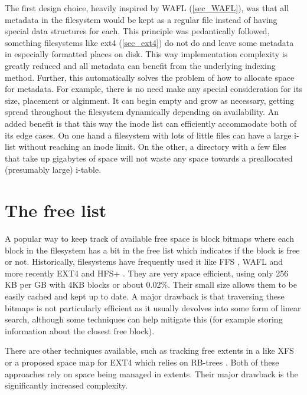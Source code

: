         The first design choice, heavily inspired by WAFL (\ref{sec_WAFL}), was
        that all metadata in the filesystem would be kept as a regular file
        instead of having special data structures for each. This principle was
        pedantically followed, something filesystems like ext4 (\ref{sec_ext4})
        do not do and leave some metadata in especially formatted places on
        disk. This way implementation complexity is greatly reduced and all
        metadata can benefit from the underlying indexing method. Further, this
        automatically solves the problem of how to allocate space for metadata.
        For example, there is no need make any special consideration for its
        size, placement or alginment. It can begin empty and grow as necessary,
        getting spread throughout the filesystem dynamically depending on
        availability. An added benefit is that this way the inode list can
        efficiently accommodate both of its edge cases. On one hand a
        filesystem with lots of little files can have a large i-list without
        reaching an inode limit. On the other, a directory with a few files
        that take up gigabytes of space will not waste any space towards a
        preallocated (presumably large) i-table.

    \section{The free list}
        \label{sec_free_list}

        A popular way to keep track of available free space is block bitmaps
        where each block in the filesystem has a bit in the free list which
        indicates if the block is free or not. Historically, filesystems have
        frequently used it like FFS \cite{FFS}, WAFL \cite{WAFL} and more
        recently EXT4 \cite{ext4_space_maps} and HFS+ \cite{HFSplus}. They are
        very space efficient, using only 256 KB per GB with 4KB blocks or about
        0.02\%. Their small size allows them to be easily cached and kept up to
        date. A major drawback is that traversing these bitmaps is not
        particularly efficient as it usually devolves into some form of linear
        search, although some techniques can help mitigate this (for example
        storing information about the closest free block).

        There are other techniques available, such as tracking free extents in
        a \bplustree like XFS \cite{XFS_scalability} or a proposed space map
        for EXT4 which relies on RB-trees \cite{ext4_space_maps}. Both of these
        approaches rely on space being managed in extents. Their major drawback is
        the significantly increased complexity.

